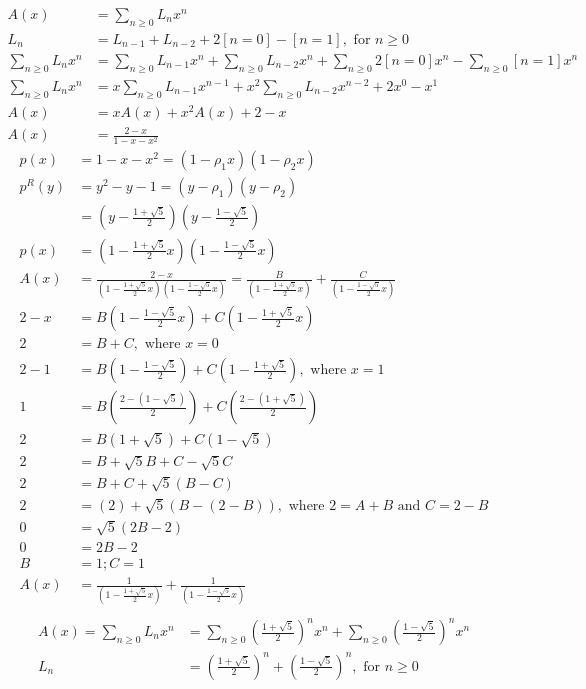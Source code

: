 \begin{align*}
	A(x) &= \sum_{n\ge 0} L_n x^n\\
	L_n &= L_{n-1} + L_{n-2} +2[n=0] - [n=1], \text{ for } n\ge 0\\
	\sum_{n\ge 0} L_n x^n &= \sum_{n\ge 0} L_{n-1} x^n + \sum_{n\ge 0} L_{n-2} x^n + \sum_{n\ge 0} 2[n=0] x^n - \sum_{n\ge 0} [n=1] x^n\\
	\sum_{n\ge 0} L_n x^n &= x \sum_{n\ge 0} L_{n-1} x^{n-1} + x^2 \sum_{n\ge 0} L_{n-2} x^{n-2}+ 2 x^0 - x^1\\
	A(x) &= xA(x) + x^2A(x) + 2 - x\\
	A(x) &= \frac{2-x}{1-x-x^2}
\end{align*}
\begin{align*}
	p(x) &= 1-x-x^2 = (1-\rho_1x)(1-\rho_2x)\\
	p^R(y) &= y^2-y-1 = (y-\rho_1)(y-\rho_2)\\
	&= (y-\frac{1+\sqrt{5}}{2})(y-\frac{1-\sqrt{5}}{2})\\
	p(x) &= (1-\frac{1+\sqrt{5}}{2}x)(1-\frac{1-\sqrt{5}}{2}x)\\
	A(x) &= \frac{2-x}{(1-\frac{1+\sqrt{5}}{2}x)(1-\frac{1-\sqrt{5}}{2}x)}
	=\frac{B}{(1-\frac{1+\sqrt{5}}{2}x)}+\frac{C}{(1-\frac{1-\sqrt{5}}{2}x)}\\
	2-x &= B(1-\frac{1-\sqrt{5}}{2}x) + C(1-\frac{1+\sqrt{5}}{2}x)\\
	2&= B+C, \text{ where } x=0\\
	2-1 &= B(1-\frac{1-\sqrt{5}}{2}) + C(1-\frac{1+\sqrt{5}}{2}), \text{ where } x=1\\
	1 &= B(\frac{2-(1-\sqrt{5})}{2}) + C(\frac{2-(1+\sqrt{5})}{2})\\
	2 &= B(1+\sqrt{5}) + C(1-\sqrt{5})\\
	2 &= B+\sqrt{5}B + C-\sqrt{5}C\\
	2 &= B+C + \sqrt{5}(B-C)\\
	2 &= (2) + \sqrt{5}(B-(2-B)), \text{ where } 2=A+B \text{ and } C=2-B\\
	0 &= \sqrt{5}(2B-2)\\
	0 &= 2B-2\\
	B &= 1; C =1\\
	A(x) &=  \frac{1}{(1-\frac{1+\sqrt{5}}{2}x)}+\frac{1}{(1-\frac{1-\sqrt{5}}{2}x)}\\
\end{align*}
\begin{align*}
	A(x) = \sum_{n\ge 0} L_n x^n 
	&= \sum_{n\ge 0} (\frac{1+\sqrt{5}}{2})^nx^n + \sum_{n\ge 0} (\frac{1-\sqrt{5}}{2})^nx^n\\
	L_n &= (\frac{1+\sqrt{5}}{2})^n + (\frac{1-\sqrt{5}}{2})^n, \text{ for } n\ge 0
\end{align*}
